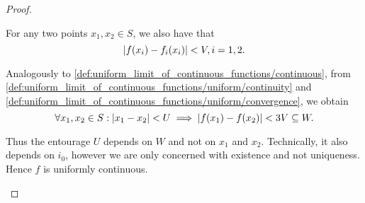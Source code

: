 \begin{proof}
\begin{description}
\begin{description}
      For any two points \( x_1, x_2 \in S \), we also have that
      \begin{equation}\label{def:uniform_limit_of_continuous_functions/uniform/convergence}
        \left\vert f(x_i) - f_i(x_i) \right\vert < V, i = 1, 2.
      \end{equation}

      Analogously to \cref{def:uniform_limit_of_continuous_functions/continuous}, from \cref{def:uniform_limit_of_continuous_functions/uniform/continuity} and \cref{def:uniform_limit_of_continuous_functions/uniform/convergence}, we obtain
      \begin{equation*}
        \forall x_1, x_2 \in S : \left\vert x_1 - x_2 \right\vert < U \implies \left\vert f(x_1) - f(x_2) \right\vert < 3V \subseteq W.
      \end{equation*}

      Thus the entourage \( U \) depends on \( W \) and not on \( x_1 \) and \( x_2 \). Technically, it also depends on \( i_0 \), however we are only concerned with existence and not uniqueness. Hence \( f \) is uniformly continuous.
    \end{description}
  \end{description}
\end{proof}

